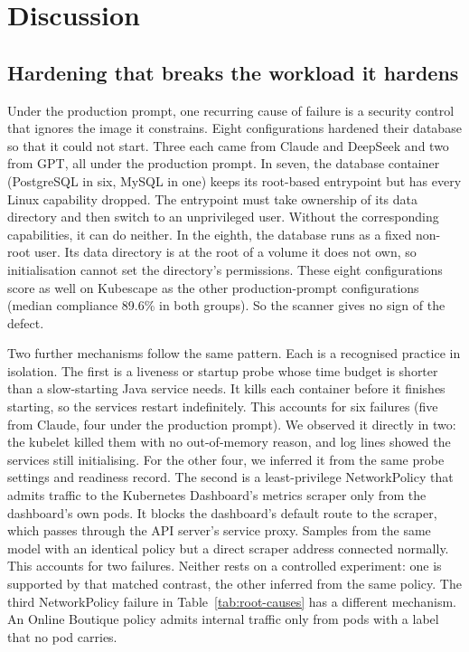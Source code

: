 \section{Discussion}\label{sec:discussion}


\subsection{Hardening that breaks the workload it hardens}\label{sec:disc-hardening}

Under the production prompt, one recurring cause of failure is a security control that ignores the image it constrains. Eight configurations hardened their database so that it could not start. Three each came from Claude and DeepSeek and two from GPT, all under the production prompt. In seven, the database container (PostgreSQL in six, MySQL in one) keeps its root-based entrypoint but has every Linux capability dropped. The entrypoint must take ownership of its data directory and then switch to an unprivileged user. Without the corresponding capabilities, it can do neither. In the eighth, the database runs as a fixed non-root user. Its data directory is at the root of a volume it does not own, so initialisation cannot set the directory's permissions. These eight configurations score as well on Kubescape as the other production-prompt configurations (median compliance 89.6\% in both groups). So the scanner gives no sign of the defect.

Two further mechanisms follow the same pattern. Each is a recognised practice in isolation. The first is a liveness or startup probe whose time budget is shorter than a slow-starting Java service needs. It kills each container before it finishes starting, so the services restart indefinitely. This accounts for six failures (five from Claude, four under the production prompt). We observed it directly in two: the kubelet killed them with no out-of-memory reason, and log lines showed the services still initialising. For the other four, we inferred it from the same probe settings and readiness record. The second is a least-privilege NetworkPolicy that admits traffic to the Kubernetes Dashboard's metrics scraper only from the dashboard's own pods. It blocks the dashboard's default route to the scraper, which passes through the API server's service proxy. Samples from the same model with an identical policy but a direct scraper address connected normally. This accounts for two failures. Neither rests on a controlled experiment: one is supported by that matched contrast, the other inferred from the same policy. The third NetworkPolicy failure in Table~\ref{tab:root-causes} has a different mechanism. An Online Boutique policy admits internal traffic only from pods with a label that no pod carries.

